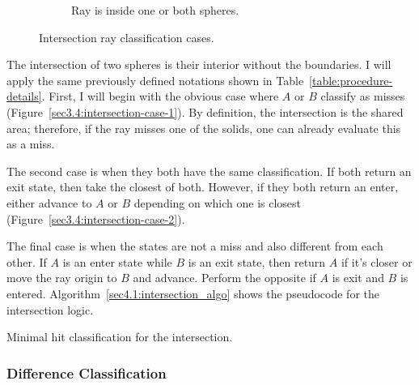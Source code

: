 \documentclass[a4paper,11pt,oneside]{article}
\begin{document}
\begin{figure}[ht]
\begin{subfigure}[b]{0.3\textwidth}
		\caption{Ray is inside one or both spheres.}
		\label{sec3.4:intersection-case-3}
	\end{subfigure}
	\caption{Intersection ray classification cases.}
	\label{sec3.4:sphere-intersection}
\end{figure}

The intersection of two spheres is their interior without the boundaries. I will apply the same previously defined notations shown in Table~\ref{table:procedure-details}. First, I will begin with the obvious case where $A$ or $B$ classify as misses (Figure~\ref{sec3.4:intersection-case-1}). By definition, the intersection is the shared area; therefore, if the ray misses one of the solids, one can already evaluate this as a miss.

The second case is when they both have the same classification. If both return an exit state, then take the closest of both. However, if they both return an enter, either advance to $A$ or $B$ depending on which one is closest (Figure~\ref{sec3.4:intersection-case-2}).

The final case is when the states are not a miss and also different from each other. If $A$ is an enter state while $B$ is an exit state, then return $A$ if it's closer or move the ray origin to $B$ and advance. Perform the opposite if $A$ is exit and $B$ is entered. Algorithm~\ref{sec4.1:intersection_algo} shows the pseudocode for the intersection logic.

\begin{algorithm}[ht]
	\SetAlgoLined
	\caption{Minimal hit classification for the intersection.}
	\label{sec4.1:intersection_algo}
\end{algorithm}

\subsubsection{Difference Classification}
\label{section:minimal_difference_classficiation}
\end{document}
